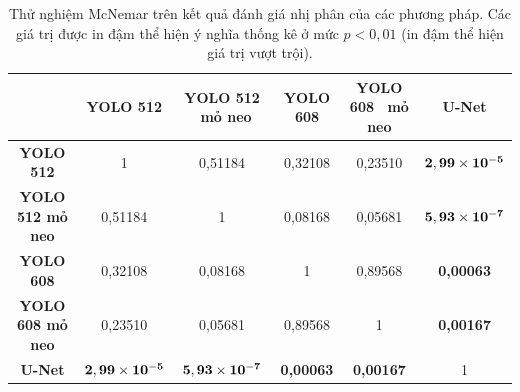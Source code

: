 \documentclass[../the.tex]{subfiles}
\begin{document}

\begin{table}[h!]
\centering
\caption{Thử nghiệm McNemar trên kết quả đánh giá nhị phân của các phương pháp. Các giá trị được in đậm thể hiện ý nghĩa thống kê ở mức $p < 0,01$ (in đậm thể hiện giá trị vượt trội).}
\small
\begin{tabular}{|c|c|c|c|c|c|}
\hline
& \multicolumn{1}{|p{2cm}|}{\textbf{YOLO 512}}
& \multicolumn{1}{|p{2cm}|}{\textbf{YOLO 512 \ mỏ neo}}  
& \multicolumn{1}{|p{2cm}|}{\textbf{YOLO 608}}
& \multicolumn{1}{|p{2cm}|}{\textbf{YOLO 608 \ mỏ neo}}
& \multicolumn{1}{|p{2cm}|}{\textbf{U-Net}} 
\\ \hline 
\textbf{YOLO 512}           & 1       & 0,51184   & 0,32108    & 0,23510  &  \textbf{$\bf 2,99 \times 10^{-5}$} \\  \hline
\textbf{YOLO 512 mỏ neo}   & 0,51184       & 1   & 0,08168    & 0,05681   & 
\textbf{$\bf 5,93 \times 10^{-7}$} \\  \hline
\textbf{YOLO 608}           & 0,32108       & 0,08168   & 1    & 0,89568 &    
\textbf{0,00063} \\  \hline
\textbf{YOLO 608 mỏ neo}   & 0,23510       & 0,05681   & 0,89568    & 1 &  
\textbf{0,00167}    \\  \hline
\textbf{U-Net}              & \textbf{$\bf 2,99 \times 10^{-5}$}       & \textbf{$\bf 5,93 \times 10^{-7}$}   & \textbf{0,00063}    & \textbf{0,00167} & 1     \\  \hline

\end{tabular}
\label{tab:mc_binary}
\end{table}


\end{document}
